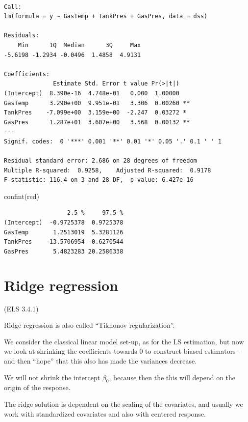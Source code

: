 \documentclass[
  letterpaper,
  DIV=11,
  numbers=noendperiod]{scrartcl}
\newenvironment{Shaded}{\begin{snugshade}}{\end{snugshade}}
\newcommand{\FunctionTok}[1]{\textcolor[rgb]{0.28,0.35,0.67}{#1}}
\newcommand{\NormalTok}[1]{\textcolor[rgb]{0.00,0.23,0.31}{#1}}
\begin{document}
\begin{verbatim}

Call:
lm(formula = y ~ GasTemp + TankPres + GasPres, data = dss)

Residuals:
    Min      1Q  Median      3Q     Max 
-5.6198 -1.2934 -0.0496  1.4858  4.9131 

Coefficients:
              Estimate Std. Error t value Pr(>|t|)   
(Intercept)  8.390e-16  4.748e-01   0.000  1.00000   
GasTemp      3.290e+00  9.951e-01   3.306  0.00260 **
TankPres    -7.099e+00  3.159e+00  -2.247  0.03272 * 
GasPres      1.287e+01  3.607e+00   3.568  0.00132 **
---
Signif. codes:  0 '***' 0.001 '**' 0.01 '*' 0.05 '.' 0.1 ' ' 1

Residual standard error: 2.686 on 28 degrees of freedom
Multiple R-squared:  0.9258,    Adjusted R-squared:  0.9178 
F-statistic: 116.4 on 3 and 28 DF,  p-value: 6.427e-16
\end{verbatim}

\begin{Shaded}
\begin{Highlighting}[]
\FunctionTok{confint}\NormalTok{(red)}
\end{Highlighting}
\end{Shaded}

\begin{verbatim}
                  2.5 %     97.5 %
(Intercept)  -0.9725378  0.9725378
GasTemp       1.2513019  5.3281126
TankPres    -13.5706954 -0.6270544
GasPres       5.4823283 20.2586338
\end{verbatim}

\hypertarget{ridge-regression}{%
\section{Ridge regression}\label{ridge-regression}}

(ELS 3.4.1)

Ridge regression is also called ``Tikhonov regularization''.

We consider the classical linear model set-up, as for the LS estimation,
but now we look at shrinking the coefficients towards 0 to construct
biased estimators - and then ``hope'' that this also has made the
variances decrease.

We will not shrink the intercept \(\beta_0\), because then the this will
depend on the origin of the response.

The ridge solution is dependent on the scaling of the covariates, and
usually we work with standardized covariates and also with centered
response.
\end{document}
